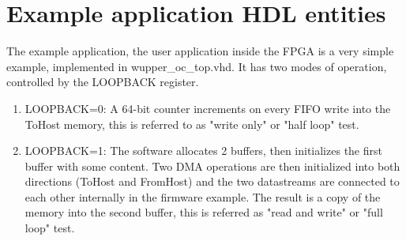 \section{Example application HDL entities}
\label{sec:ExampleApp}
The example application, the user application inside the FPGA is a very simple example, implemented in wupper\_oc\_top.vhd. It has two modes of operation, controlled by the LOOPBACK register. 

\begin{enumerate}
	\item LOOPBACK=0: A 64-bit counter increments on every FIFO write into the ToHost memory, this is referred to as "write only" or "half loop" test. 
	\item LOOPBACK=1: The software allocates 2 buffers, then initializes the first buffer with some content. Two DMA operations are then initialized into both directions (ToHost and FromHost) and the two datastreams are connected to each other internally in the firmware example. The result is a copy of the memory into the second buffer, this is referred as "read and write" or "full loop" test.  
\end{enumerate}
